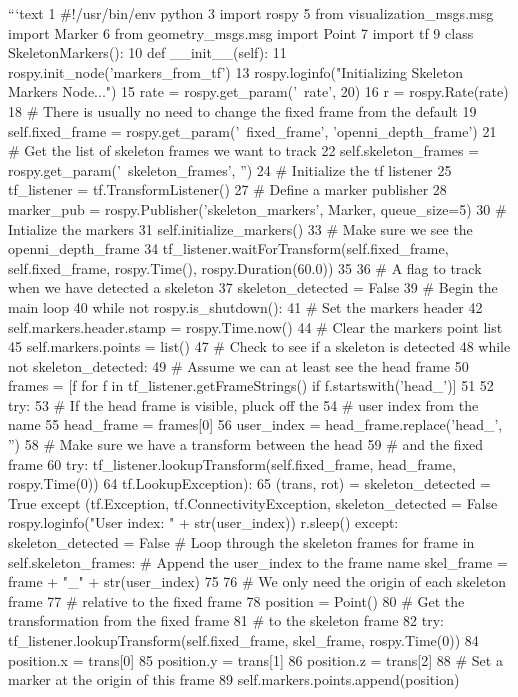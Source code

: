 ```text
1 #!/usr/bin/env python 
3 import rospy
5 from visualization_msgs.msg import Marker
6 from geometry_msgs.msg import Point
7 import tf
9 class SkeletonMarkers():
10 def __init__(self):
11 rospy.init_node('markers_from_tf')
13 rospy.loginfo("Initializing Skeleton Markers Node...") 
15 rate = rospy.get_param('~rate', 20)
16 r = rospy.Rate(rate)
18 # There is usually no need to change the fixed frame from the default
19 self.fixed_frame = rospy.get_param('~fixed_frame',
'openni_depth_frame') 
21 # Get the list of skeleton frames we want to track
22 self.skeleton_frames = rospy.get_param('~skeleton_frames', '')
24 # Initialize the tf listener
25 tf_listener = tf.TransformListener()
27 # Define a marker publisher
28 marker_pub = rospy.Publisher('skeleton_markers', Marker, queue_size=5)
30 # Intialize the markers
31 self.initialize_markers()
33 # Make sure we see the openni_depth_frame
34 tf_listener.waitForTransform(self.fixed_frame, self.fixed_frame,
rospy.Time(), rospy.Duration(60.0)) 35
36 # A flag to track when we have detected a skeleton
37 skeleton_detected = False
39 # Begin the main loop
40 while not rospy.is_shutdown():
41 # Set the markers header
42 self.markers.header.stamp = rospy.Time.now()
44 # Clear the markers point list
45 self.markers.points = list()
47 # Check to see if a skeleton is detected
48 while not skeleton_detected:
49 # Assume we can at least see the head frame
50 frames = [f for f in tf_listener.getFrameStrings() if
f.startswith('head_')] 51
52 try:
53 # If the head frame is visible, pluck off the
54 # user index from the name
55 head_frame = frames[0]
56 user_index = head_frame.replace('head_', '')
58 # Make sure we have a transform between the head
59 # and the fixed frame
60 try:
tf_listener.lookupTransform(self.fixed_frame, head_frame, rospy.Time(0))
64 tf.LookupException): 65
(trans, rot) =
skeleton_detected = True
except (tf.Exception, tf.ConnectivityException,
skeleton_detected = False
rospy.loginfo("User index: " + str(user_index)) r.sleep()
except:
skeleton_detected = False
# Loop through the skeleton frames
for frame in self.skeleton_frames:
# Append the user_index to the frame name
skel_frame = frame + "_" + str(user_index) 75
76 # We only need the origin of each skeleton frame
77 # relative to the fixed frame
78 position = Point()
80 # Get the transformation from the fixed frame
81 # to the skeleton frame
82 try:
tf_listener.lookupTransform(self.fixed_frame, skel_frame, rospy.Time(0))
84 position.x = trans[0]
85 position.y = trans[1]
86 position.z = trans[2]
88 # Set a marker at the origin of this frame
89 self.markers.points.append(position)
